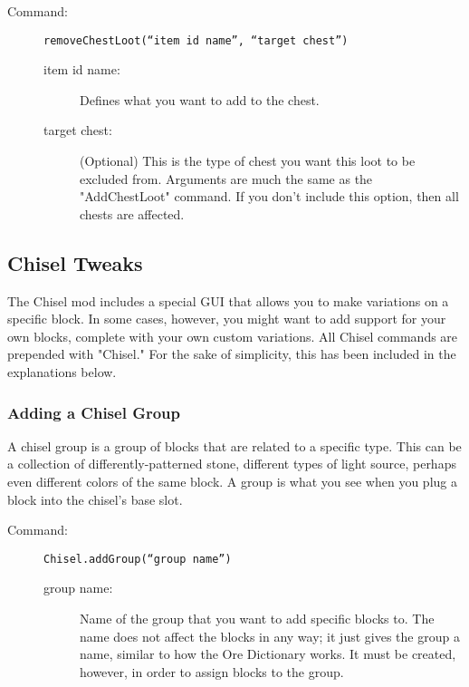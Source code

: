 \documentclass[letterpaper,titlepage,12pt]{article}
\begin{document}
\begin{description}
\item[Command:] \texttt{removeChestLoot(``item id name'', ``target chest'')}
\begin{description}
\item [item id name:] Defines what you want to add to the chest.
\item [target chest:] (Optional) This is the type of chest you want this loot to be excluded from.  Arguments are much the same as the "AddChestLoot" command. If you don't include this option, then all chests are affected.
\end{description}
\end{description}

\subsection{Chisel Tweaks}

The Chisel mod includes a special GUI that allows you to make variations on a specific block.  In some cases, however, you might want to add support for your own blocks, complete with your own custom variations.  All Chisel commands are prepended with "Chisel."  For the sake of simplicity, this has been included in the explanations below.

\subsubsection{Adding a Chisel Group}

A chisel group is a group of blocks that are related to a specific type.  This can be a collection of differently-patterned stone, different types of light source, perhaps even different colors of the same block.  A group is what you see when you plug a block into the chisel's base slot.

\begin{description}
\item[Command:] \texttt{Chisel.addGroup(``group name'')}
\begin{description}
\item [group name:] Name of the group that you want to add specific blocks to.  The name does not affect the blocks in any way; it just gives the group a name, similar to how the Ore Dictionary works.  It must be created, however, in order to assign blocks to the group.
\end{description}
\end{description}
\end{document}
